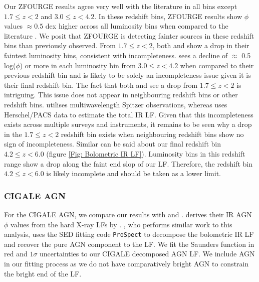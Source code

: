 Our ZFOURGE results agree very well with the literature in all bins except $1.7 \leq z < 2$ and $3.0 \leq z < 4.2$. In these redshift bins, ZFOURGE results show $\phi$ values $\approx 0.5$ dex higher across all luminosity bins when compared to the literature \citep{rodighiero_mid-_2010, gruppioni_herschel_2013}. We posit that ZFOURGE is detecting fainter sources in these redshift bins than previously observed. From $1.7 \leq z < 2$, both \cite{rodighiero_mid-_2010} and \cite{gruppioni_herschel_2013} show a drop in their faintest luminosity bins, consistent with incompleteness. \cite{gruppioni_herschel_2013} sees a decline of $\approx$ 0.5 log($\phi$) or more in each luminosity bin from $3.0 \leq z < 4.2$ when compared to their previous redshift bin and is likely to be solely an incompleteness issue given it is their final redshift bin. The fact that both \cite{gruppioni_herschel_2013} and \cite{rodighiero_mid-_2010} see a drop from $1.7 \leq z < 2$ is intriguing. This issue does not appear in neighbouring redshift bins or other redshift bins. \cite{rodighiero_mid-_2010} utilises multiwavelength Spitzer observations, whereas \cite{gruppioni_herschel_2013} uses Herschel/PACS data to estimate the total IR LF. Given that this incompleteness exists across multiple surveys and instruments, it remains to be seen why a drop in the $1.7 \leq z < 2$ redshift bin exists when neighbouring redshift bins show no sign of incompleteness. Similar can be said about our final redshift bin $4.2 \leq z < 6.0$ (figure \ref{Fig: Bolometric IR LF}). Luminosity bins in this redshift range show a drop along the faint end slop of our LF. Therefore, the redshift bin $4.2 \leq z < 6.0$ is likely incomplete and should be taken as a lower limit.

\subsubsection{CIGALE AGN}
For the CIGALE AGN, we compare our results with \cite{delvecchio_tracing_2014, symeonidis_agn_2021} and \cite{thorne_deep_2022}. \cite{symeonidis_agn_2021} derives their IR AGN $\phi$ values from the hard X-ray LFs by \cite{aird_evolution_2015}. \cite{thorne_deep_2022}, who performs similar work to this analysis, uses the SED fitting code \texttt{ProSpect} \citep{leja_deriving_2017, robotham_prospect_2020} to decompose the bolometric IR LF and recover the pure AGN component to the LF. We fit the Saunders function in red and $1\sigma$ uncertainties to our CIGALE decomposed AGN LF. We include \cite{thorne_deep_2022} AGN in our fitting process as we do not have comparatively bright AGN to constrain the bright end of the LF. 

